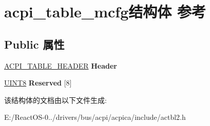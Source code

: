 \hypertarget{structacpi__table__mcfg}{}\section{acpi\+\_\+table\+\_\+mcfg结构体 参考}
\label{structacpi__table__mcfg}
\subsection*{Public 属性}
\begin{DoxyCompactItemize}
\item 
\mbox{\label{structacpi__table__mcfg_a9b6ab086ec80722e5ce2524ab3edb992}} 
\hyperlink{structacpi__table__header}{A\+C\+P\+I\+\_\+\+T\+A\+B\+L\+E\+\_\+\+H\+E\+A\+D\+ER} {\bfseries Header}
\item 
\mbox{\label{structacpi__table__mcfg_aa5a64dc350b2378311359e8b59231714}} 
\hyperlink{_processor_bind_8h_ab27e9918b538ce9d8ca692479b375b6a}{U\+I\+N\+T8} {\bfseries Reserved} \mbox{[}8\mbox{]}
\end{DoxyCompactItemize}


该结构体的文档由以下文件生成\+:\begin{DoxyCompactItemize}
\item 
E\+:/\+React\+O\+S-\/0../drivers/bus/acpi/acpica/include/actbl2.\+h\end{DoxyCompactItemize}
